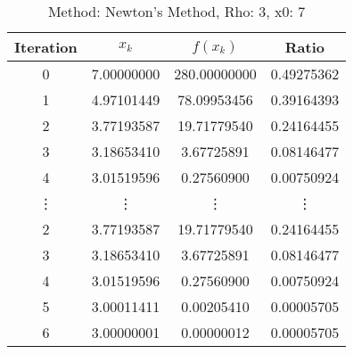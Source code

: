 \begin{table}
\centering
\caption{Method: Newton's Method, Rho: 3, x0: 7}
\label{tab:table_Newton's_Method_3_7}
\begin{tabular}{c c c c}
\toprule
Iteration &      $x_k$ &     $f(x_k)$ &      Ratio \\
\midrule
        0 & 7.00000000 & 280.00000000 & 0.49275362 \\
        1 & 4.97101449 &  78.09953456 & 0.39164393 \\
        2 & 3.77193587 &  19.71779540 & 0.24164455 \\
        3 & 3.18653410 &   3.67725891 & 0.08146477 \\
        4 & 3.01519596 &   0.27560900 & 0.00750924 \\
   \vdots &     \vdots &       \vdots &     \vdots \\
        2 & 3.77193587 &  19.71779540 & 0.24164455 \\
        3 & 3.18653410 &   3.67725891 & 0.08146477 \\
        4 & 3.01519596 &   0.27560900 & 0.00750924 \\
        5 & 3.00011411 &   0.00205410 & 0.00005705 \\
        6 & 3.00000001 &   0.00000012 & 0.00005705 \\
\bottomrule
\end{tabular}
\end{table}
